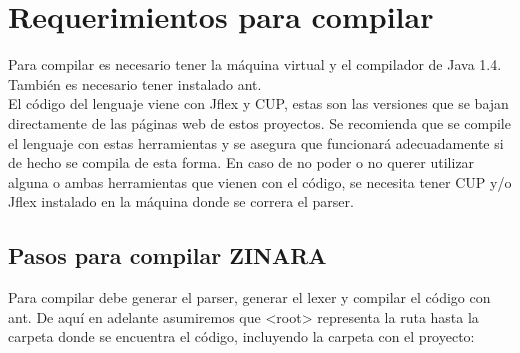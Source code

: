 \documentclass[12pt, spanish]{report}
\begin{document}
\section{Requerimientos para compilar}
\label{sec:requ}
Para compilar es necesario tener la máquina virtual y el compilador de
Java 1.4. También es necesario tener instalado ant.\\
El código del lenguaje viene con Jflex y CUP, estas son las versiones
que se bajan directamente de las páginas web de estos proyectos. Se
recomienda que se compile el lenguaje con estas herramientas y se
asegura que funcionará adecuadamente si de hecho se compila de esta
forma. En caso de no poder o no querer utilizar alguna o ambas
herramientas que vienen con el código, se necesita tener CUP y/o Jflex
instalado en la máquina donde se correra el parser.\\

\subsection{Pasos para compilar ZINARA}
\label{sec:compilacion}
Para compilar debe generar el parser, generar el lexer y compilar el
c\'odigo con ant. De aqu\'i en adelante asumiremos que <root> representa
la ruta hasta la carpeta donde se encuentra el c\'odigo, incluyendo la
carpeta con el proyecto:
\end{document}
